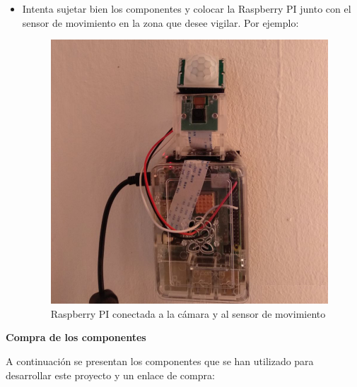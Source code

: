 \begin{itemize}
\item Intenta sujetar bien los componentes y colocar la Raspberry PI junto con el sensor de movimiento en la zona que desee vigilar. Por ejemplo:

\begin{figure}[H]
	\centering
	\includegraphics[scale=0.6]{images/49}
	\caption{Raspberry PI conectada a la cámara y al sensor de movimiento}
\end{figure}

\end{itemize}

\textbf{Compra de los componentes}

A continuación se presentan los componentes que se han utilizado para desarrollar este proyecto y un enlace de compra:

